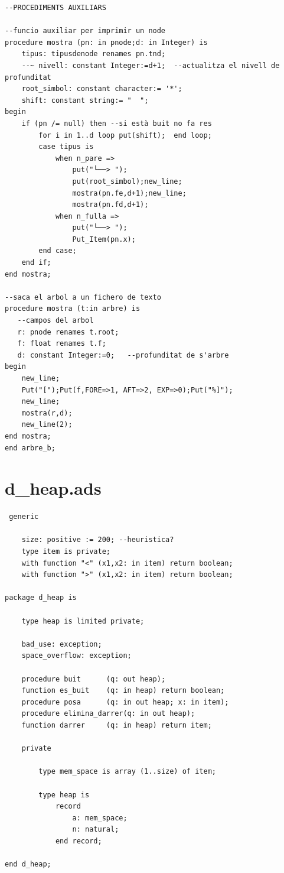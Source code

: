 \documentclass[a4paper,12pt]{article}
\begin{document}
\begin{lstlisting}
--PROCEDIMENTS AUXILIARS

--funcio auxiliar per imprimir un node
procedure mostra (pn: in pnode;d: in Integer) is 
	tipus: tipusdenode renames pn.tnd;
	--~ nivell: constant Integer:=d+1;	--actualitza el nivell de profunditat
	root_simbol: constant character:= '*';
	shift: constant string:= "  "; 
begin	
	if (pn /= null) then --si està buit no fa res
		for i in 1..d loop put(shift);	end loop;
		case tipus is
			when n_pare =>  
				put("└──> ");				
				put(root_simbol);new_line;				
				mostra(pn.fe,d+1);new_line;
				mostra(pn.fd,d+1);
			when n_fulla => 
				put("└──> ");
				Put_Item(pn.x);
		end case;
	end if;
end mostra;

--saca el arbol a un fichero de texto
procedure mostra (t:in arbre) is
   --campos del arbol
   r: pnode renames t.root;
   f: float renames t.f;
   d: constant Integer:=0;   --profunditat de s'arbre
begin
	new_line;
    Put("[");Put(f,FORE=>1, AFT=>2, EXP=>0);Put("%]");
	new_line;
	mostra(r,d);
	new_line(2);
end mostra;
end arbre_b;

\end{lstlisting}


\section{d\_heap.ads}
\begin{lstlisting}
 generic
	
	size: positive := 200; --heuristica?
	type item is private;
	with function "<" (x1,x2: in item) return boolean;
	with function ">" (x1,x2: in item) return boolean;

package d_heap is

	type heap is limited private;
	
	bad_use: exception;
	space_overflow: exception;
	
	procedure buit   	(q: out heap);
	function es_buit 	(q: in heap) return boolean;	
	procedure posa		(q: in out heap; x: in item);
	procedure elimina_darrer(q: in out heap);
	function darrer		(q: in heap) return item;

	private
	
		type mem_space is array (1..size) of item;
		
		type heap is
			record
				a: mem_space;
				n: natural;
			end record;

end d_heap;

\end{lstlisting}
\end{document}
